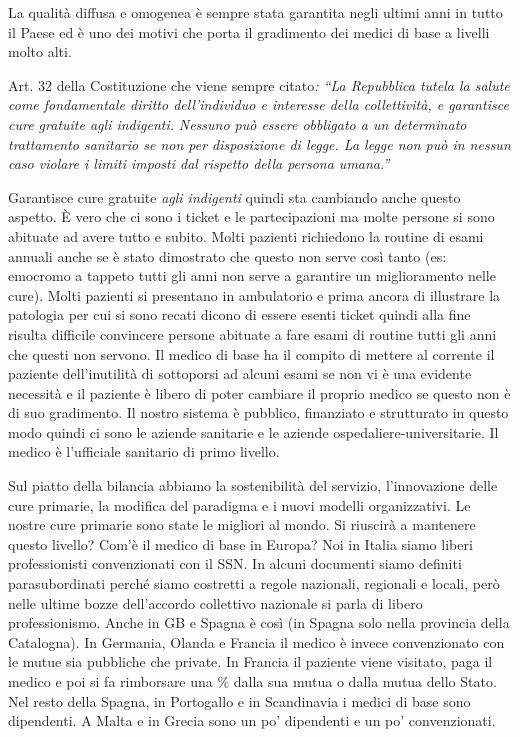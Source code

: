 \documentclass[]{article}
\begin{document}
La qualità diffusa e omogenea è sempre stata garantita negli ultimi anni
in tutto il Paese ed è uno dei motivi che porta il gradimento dei medici
di base a livelli molto alti.

Art. 32 della Costituzione che viene sempre citato\emph{: ``La
Repubblica tutela la salute come fondamentale diritto dell'individuo e
interesse della collettività, e garantisce cure gratuite agli
indigenti.}\protect\hypertarget{2}{}{} \emph{Nessuno può essere
obbligato a un determinato trattamento sanitario se non per disposizione
di legge. La legge non può in nessun caso violare i limiti imposti dal
rispetto della persona umana.''}

Garantisce cure gratuite \emph{agli indigenti} quindi sta cambiando
anche questo aspetto. È vero che ci sono i ticket e le partecipazioni ma
molte persone si sono abituate ad avere tutto e subito. Molti pazienti
richiedono la routine di esami annuali anche se è stato dimostrato che
questo non serve così tanto (es: emocromo a tappeto tutti gli anni non
serve a garantire un miglioramento nelle cure). Molti pazienti si
presentano in ambulatorio e prima ancora di illustrare la patologia per
cui si sono recati dicono di essere esenti ticket quindi alla fine
risulta difficile convincere persone abituate a fare esami di routine
tutti gli anni che questi non servono. Il medico di base ha il compito
di mettere al corrente il paziente dell'inutilità di sottoporsi ad
alcuni esami se non vi è una evidente necessità e il paziente è libero
di poter cambiare il proprio medico se questo non è di suo gradimento.
Il nostro sistema è pubblico, finanziato e strutturato in questo modo
quindi ci sono le aziende sanitarie e le aziende
ospedaliere-universitarie. Il medico è l'ufficiale sanitario di primo
livello.

Sul piatto della bilancia abbiamo la sostenibilità del servizio,
l'innovazione delle cure primarie, la modifica del paradigma e i nuovi
modelli organizzativi. Le nostre cure primarie sono state le migliori al
mondo. Si riuscirà a mantenere questo livello? Com'è il medico di base
in Europa? Noi in Italia siamo liberi professionisti convenzionati con
il SSN. In alcuni documenti siamo definiti parasubordinati perché siamo
costretti a regole nazionali, regionali e locali, però nelle ultime
bozze dell'accordo collettivo nazionale si parla di libero
professionismo. Anche in GB e Spagna è così (in Spagna solo nella
provincia della Catalogna). In Germania, Olanda e Francia il medico è
invece convenzionato con le mutue sia pubbliche che private. In Francia
il paziente viene visitato, paga il medico e poi si fa rimborsare una \%
dalla sua mutua o dalla mutua dello Stato. Nel resto della Spagna, in
Portogallo e in Scandinavia i medici di base sono dipendenti. A Malta e
in Grecia sono un po' dipendenti e un po' convenzionati.
\end{document}

